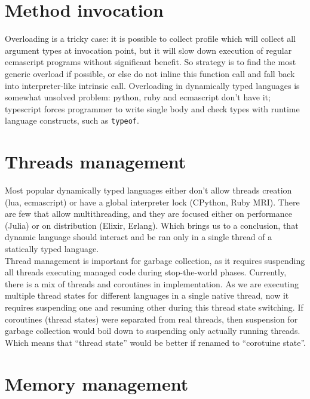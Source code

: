 \documentclass[times, %
               specification,annotation, %
               titlepage-extra-ru,specification-extra-ru,annotation-extra-ru, %
               languages={russian,english} %
              ]{itmo-student-thesis}
\begin{document}
\section{Method invocation}
Overloading is a tricky case: it is possible to collect profile which will collect all argument types at invocation point, but it will slow down execution of regular ecmascript programs without significant benefit. So strategy is to find the most generic overload if possible, or else do not inline this function call and fall back into interpreter-like intrinsic call. Overloading in dynamically typed languages is somewhat unsolved problem: python, ruby and ecmascript don't have it; typescript forces programmer to write single body and check types with runtime language constructs, such as \texttt{typeof}.

\section{Threads management}
Most popular dynamically typed languages either don't allow threads creation (lua, ecmascript) or have a global interpreter lock (CPython, Ruby MRI). There are few that allow multithreading, and they are focused either on performance (Julia) or on distribution (Elixir, Erlang). Which brings us to a conclusion, that dynamic language should interact and be ran only in a single thread of a statically typed language.\\
Thread management is important for garbage collection, as it requires suspending all threads executing managed code during stop-the-world phases. Currently, there is a mix of threads and coroutines in implementation. As we are executing multiple thread states for different languages in a single native thread, now it requires suspending one and resuming other during this thread state switching. If coroutines (thread states) were separated from real threads, then suspension for garbage collection would boil down to suspending only actually running threads. Which means that ``thread state'' would be better if renamed to ``corotuine state''.

\section{Memory management}
\end{document}
